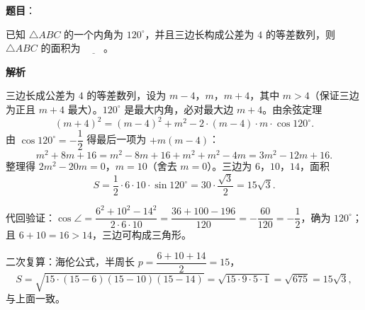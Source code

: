\begin{answer}

\textbf{题目}：

已知 $\triangle ABC$ 的一个内角为 $120^\circ$，并且三边长构成公差为 $4$ 的等差数列，则 $\triangle ABC$ 的面积为 $\underline{\qquad}$。

\textbf{解析}

三边长成公差为 $4$ 的等差数列，设为 $m-4$，$m$，$m+4$，其中 $m>4$（保证三边为正且 $m+4$ 最大）。$120^\circ$ 是最大内角，必对最大边 $m+4$。由余弦定理
\nopagebreak[4]
\[(m+4)^2=(m-4)^2+m^2-2\cdot(m-4)\cdot m\cdot\cos120^\circ.\]
由 $\cos120^\circ=-\dfrac12$ 得最后一项为 $+m(m-4)$：
\nopagebreak[4]
\[m^2+8m+16=m^2-8m+16+m^2+m^2-4m=3m^2-12m+16.\]
整理得 $2m^2-20m=0$，$m=10$（舍去 $m=0$）。三边为 $6$，$10$，$14$，面积
\nopagebreak[4]
\[S=\frac12\cdot6\cdot10\cdot\sin120^\circ=30\cdot\frac{\sqrt3}{2}=15\sqrt3.\]

代回验证：$\cos\angle=\dfrac{6^2+10^2-14^2}{2\cdot6\cdot10}=\dfrac{36+100-196}{120}=-\dfrac{60}{120}=-\dfrac12$，确为 $120^\circ$；且 $6+10=16>14$，三边可构成三角形。

二次复算：海伦公式，半周长 $p=\dfrac{6+10+14}{2}=15$，
\nopagebreak[4]
\[S=\sqrt{15\cdot(15-6)(15-10)(15-14)}=\sqrt{15\cdot9\cdot5\cdot1}=\sqrt{675}=15\sqrt3,\]
与上面一致。


\end{answer}
